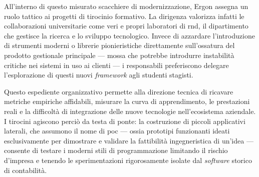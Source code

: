All'interno di questo misurato scacchiere di modernizzazione, Ergon assegna un ruolo tattico ai progetti di tirocinio formativo. La dirigenza valorizza infatti le collaborazioni universitarie come veri e propri laboratori di \gls{rnd}, il dipartimento che gestisce la ricerca e lo sviluppo tecnologico. Invece di azzardare l'introduzione di strumenti moderni o librerie pionieristiche direttamente sull'ossatura del prodotto gestionale principale --- mossa che potrebbe introdurre instabilità critiche nei sistemi in uso ai clienti --- i responsabili preferiscono delegare l'esplorazione di questi nuovi \textit{framework} agli studenti stagisti.

Questo espediente organizzativo permette alla direzione tecnica di ricavare metriche empiriche affidabili, misurare la curva di apprendimento, le prestazioni reali e la difficoltà di integrazione delle nuove tecnologie nell'ecosistema aziendale. I tirocini agiscono perciò da testa di ponte: la costruzione di piccoli applicativi laterali, che assumono il nome di \gls{poc} --- ossia prototipi funzionanti ideati esclusivamente per dimostrare e validare la fattibilità ingegneristica di un'idea --- consente di testare i moderni stili di programmazione limitando il rischio d'impresa e tenendo le sperimentazioni rigorosamente isolate dal \textit{software} storico di contabilità.